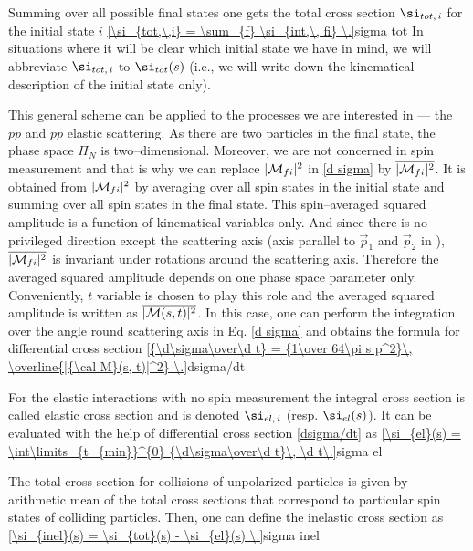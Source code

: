 Summing over all possible final states one gets the total cross section $\si_{tot,\, i}$ for the initial state $i$
\eqref{\si_{tot,\,i} = \sum_{f} \si_{int,\, fi} \.}{sigma tot}
In situations where it will be clear which initial state we have in mind, we will abbreviate $\si_{tot,\, i}$ to $\si_{tot}(s)$ (i.e., we will write down the kinematical description of the initial state only).

This general scheme can be applied to the processes we are interested in --- the $pp$ and $\bar pp$ elastic scattering. As there are two particles in the final state, the phase space $\Pi_N$ is two--dimensional. Moreover, we are not concerned in spin measurement and that is why we can replace $|{\cal M}_{fi}|^2$ in \equ{} \ref{d sigma} by $\overline{|{\cal M}_{fi}|^2}$. It is obtained from $|{\cal M}_{fi}|^2$ by averaging over all spin states in the initial state and summing over all spin states in the final state. This spin--averaged squared amplitude is a function of kinematical variables only. And since there is no privileged direction except the scattering axis (axis parallel to $\vec p_1$ and $\vec p_2$ in \fg {}), $\overline{|{\cal M}_{fi}|^2}$ is invariant under rotations around the scattering axis. Therefore the averaged squared amplitude depends on one phase space parameter only. Conveniently, $t$ variable is chosen to play this role and the averaged squared amplitude is written as $\overline{|{\cal M}(s, t)|^2}$. In this case, one can perform the integration over the angle round scattering axis in Eq. \ref{d sigma} and obtains the formula for differential cross section
\eqref{{\d\sigma\over\d t} = {1\over 64\pi s p^2}\, \overline{|{\cal M}(s, t)|^2} \.}{dsigma/dt}

For the elastic interactions with no spin measurement the integral cross section is called elastic cross section and is denoted $\si_{el,\,i}$ (resp. $\si_{el}(s)$). It can be evaluated with the help of differential cross section \ref{dsigma/dt} as
\eqref{\si_{el}(s) = \int\limits_{t_{min}}^{0} {\d\sigma\over\d t}\, \d t\.}{sigma el}

The total cross section for collisions of unpolarized particles is given by arithmetic mean of the total cross sections that correspond to particular spin states of colliding particles. Then, one can define the inelastic cross section as
\eqref{\si_{inel}(s) = \si_{tot}(s) - \si_{el}(s) \.}{sigma inel}

